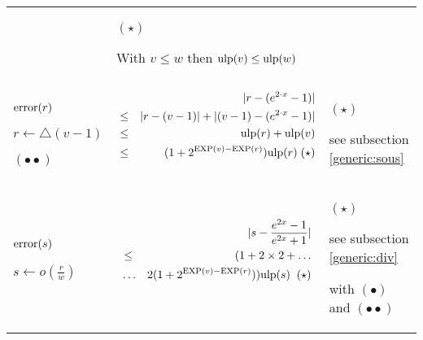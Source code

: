 \documentclass[12pt]{amsart}
\def\pinf{\bigtriangleup}
\def\ulp{{\rm ulp}}
\def\Exp{{\rm EXP}}
\begin{document}
\begin{center}
\begin{tabular}{l l l}
\begin{minipage}{7.5cm}
\end{minipage} &
\begin{minipage}{6cm}
$(\star)$

With $v \leq w$ then $\ulp(v) \leq \ulp(w)$ 

\end{minipage}\\%
\begin{minipage}{2.5cm}
${\textnormal{error}}(r)$


$r \leftarrow \pinf(v-1) $

$(\bullet\bullet)$
\end{minipage} &
\begin{minipage}{7.5cm}



\begin{eqnarray}\nonumber
  &&|r-(e^{2 \cdot x}-1)| \\\nonumber
  &\leq&  |r - (v-1)|+|(v-1) - (e^{2 \cdot x}-1)|\\\nonumber
  &\leq&  \ulp(r) + \ulp(v)\\\nonumber
  &\leq&  (1+2^{\Exp(v)-\Exp(r)}) \ulp(r)\;(\star)\\\nonumber
\end{eqnarray}

\end{minipage} &
\begin{minipage}{6cm}
$(\star)$


see subsection \ref{generic:sous}

\end{minipage}\\%
\begin{minipage}{2.5cm}
${\textnormal{error}}(s)$


$s \leftarrow o(\frac{r}{w}) $
\end{minipage} &
\begin{minipage}{7.5cm}



\begin{eqnarray}\nonumber
  &&|s-\frac{e^{2x}-1}{e^{2x}+1}| \\\nonumber
  &\leq& (1+2 \times 2+ \hdots\\\nonumber
  &\hdots& 2(1+2^{\Exp(v)-\Exp(r)})) \ulp(s) \;\;(\star)\\\nonumber
\end{eqnarray}

\end{minipage} &
\begin{minipage}{6cm}
$(\star)$


see subsection \ref{generic:div}


with $(\bullet)$ and $(\bullet\bullet)$

\end{minipage}
\end{tabular}
\end{center}
\end{document}
